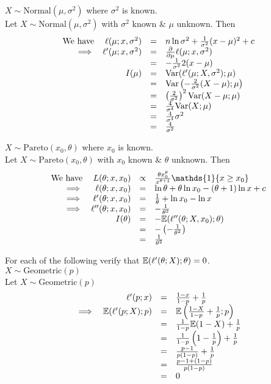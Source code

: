 \documentclass[11pt,a4paper]{article}
\begin{document}
\qpartt
$X\sim\text{Normal}(\mu,\sigma^2)$ where $\sigma^2$ is known.\\

\apart
Let $X\sim\text{Normal}(\mu,\sigma^2)$ with $\sigma^2$ known \& $\mu$ unknown. Then
\[\begin{array}{rrcl}
\text{We have}&\ell(\mu;x,\sigma^2)&=&n\ln\sigma^2+\frac{1}{\sigma^2}(x-\mu)^2+c\\
\implies&\ell'(\mu;x,\sigma^2)&=&\frac{\partial}{\partial\mu}\ell(\mu;x,\sigma^2)\\
&&=&-\frac{1}{\sigma^2}2(x-\mu)\\
&I(\mu)&=&\mathrm{Var}(\ell'(\mu;X,\sigma^2);\mu)\\
&&=&\mathrm{Var}\left(-\frac{2}{\sigma^2}(X-\mu);\mu\right)\\
&&=&\left(\frac{2}{\sigma^2}\right)^2\mathrm{Var}(X-\mu;\mu)\\
&&=&\frac{4}{\sigma^4}\mathrm{Var}(X;\mu)\\
&&=&\frac{4}{\sigma^4}\sigma^2\\
&&=&\frac{4}{\sigma^2}
\end{array}\]

\qpartt
$X\sim\text{Pareto}(x_0,\theta)$ where $x_0$ is known.\\

\apart
Let $X\sim\text{Pareto}(x_0,\theta)$ with $x_0$ known \& $\theta$ unknown. Then
\[\begin{array}{rrcl}
\text{We have}&L(\theta;x,x_0)&\propto&\frac{\theta x_0^\theta}{x^{\theta+1}}\mathds{1}\{x\geq x_0\}\\
\implies&\ell(\theta;x,x_0)&=&\ln\theta+\theta\ln x_0-(\theta+1)\ln x+c\\
\implies&\ell'(\theta;x,x_0)&=&\frac{1}{\theta}+\ln x_0-\ln x\\
\implies&\ell''(\theta;x,x_0)&=&-\frac{1}{\theta^2}\\
&I(\theta)&=&-\expect(\ell''(\theta;X,x_0);\theta)\\
&&=&-\left(-\frac{1}{\theta^2}\right)\\
&&=&\frac{1}{\theta^2}
\end{array}\]

\newpage
\question
For each of the following verify that $\mathbb{E}(\ell'(\theta;X);\theta)=0$.\\

\qpartt
$X\sim\text{Geometric}(p)$\\

\apart
Let $X\sim\text{Geometric}(p)$
\[\begin{array}{rrrl}
&\ell'(p;x)&=&\frac{1-x}{1-p}+\frac{1}{p}\\
\implies&\mathbb{E}(\ell'(p;X);p)&=&\mathbb{E}\left(\frac{1-X}{1-p}+\frac{1}{p};p\right)\\
&&=&\frac{1}{1-p}\mathbb{E}(1-X)+\frac{1}{p}\\
&&=&\frac{1}{1-p}\left(1-\frac{1}{p}\right)+\frac{1}{p}\\
&&=&\frac{p-1}{p(1-p)}+\frac{1}{p}\\
&&=&\frac{p-1+(1-p)}{p(1-p)}\\
&&=&0
\end{array}\]
\end{document}
